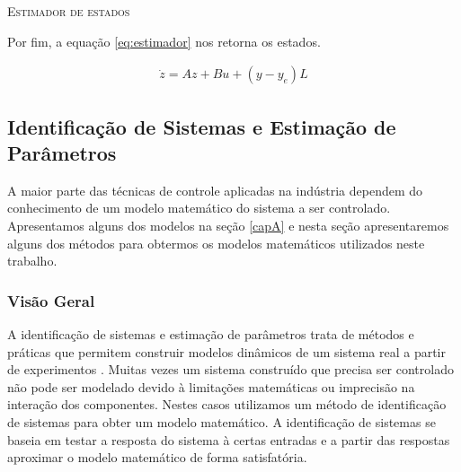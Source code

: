 \IncMargin{1em}
\begin{algorithm}[H]
	
	\label{alg:ee}
	\caption{\textsc{Estimador de estados}}
\end{algorithm}
\DecMargin{1em}


Por fim, a equação \ref{eq:estimador} nos retorna os estados.

\begin{equation}\label{eq:estimador}
\begin{matrix}
\dot{z}=Az+Bu+(y-y_e)L
\end{matrix}
\end{equation}

\subsection{Identificação de Sistemas e Estimação de Parâmetros}
A maior parte das técnicas de controle aplicadas na indústria dependem do conhecimento de um modelo matemático do sistema a ser controlado. Apresentamos alguns dos modelos na seção \ref{capA} e nesta seção apresentaremos alguns dos métodos para obtermos os modelos matemáticos utilizados neste trabalho.


\subsubsection{Visão Geral}
A identificação de sistemas e estimação de parâmetros trata de métodos e práticas que permitem construir modelos dinâmicos de um sistema real a partir de experimentos . Muitas vezes um sistema construído que precisa ser controlado não pode ser modelado devido à limitações matemáticas ou imprecisão na interação dos componentes. Nestes casos utilizamos um método de identificação de sistemas para obter um modelo matemático. A identificação de sistemas se baseia em testar a resposta do sistema à certas entradas e a partir das respostas aproximar o modelo matemático de forma satisfatória.

